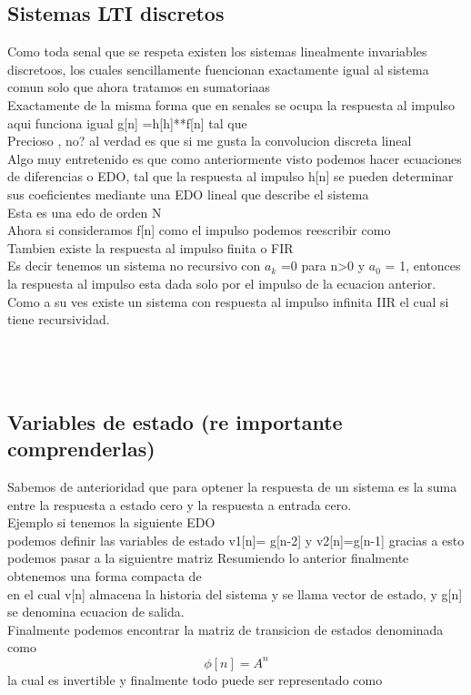 \subsection{Sistemas LTI discretos}
Como toda senal que se respeta existen los sistemas linealmente invariables discretoos, los cuales sencillamente fuencionan exactamente igual al sistema comun solo que ahora tratamos en sumatoriaas\\
Exactamente de la misma forma que en senales se ocupa la respuesta al impulso aqui funciona igual g[n] =h[h]**f[n]  tal que
 \\ Precioso , no? al verdad es que si me gusta la convolucion discreta lineal \\
Algo muy entretenido es que como anteriormente visto podemos hacer ecuaciones de diferencias o EDO, tal que la respuesta al impulso h[n] se pueden determinar sus coeficientes mediante una EDO lineal que describe el sistema
\\ Esta es una edo de orden N \\
Ahora si consideramos f[n] como el impulso podemos reescribir como
 \\
Tambien existe la respuesta al impulso finita o FIR\\
Es decir tenemos un sistema no recursivo con $a_k$ =0 para n>0 y $a_0$ = 1, entonces la respuesta al impulso esta dada solo por el impulso de la ecuacion anterior. \\
Como a su ves existe un sistema con respuesta al impulso infinita IIR el cual si tiene recursividad.
 \\ \\ \\ \\ 
\subsection{Variables de estado (re importante comprenderlas)}
Sabemos de anterioridad que para optener la respuesta de un sistema es la suma entre la respuesta a estado cero y la respuesta a entrada cero. \\
Ejemplo si tenemos la siguiente  EDO
 \\ podemos definir las variables de estado v1[n]= g[n-2] y v2[n]=g[n-1] gracias a esto podemos pasar a la siguientre matriz
Resumiendo lo anterior finalmente obtenemos una forma compacta de 
\\ en el cual v[n] almacena la historia del sistema y se llama vector de estado, y g[n] se denomina ecuacion de salida.\\
Finalmente podemos encontrar la matriz de transicion de estados denominada como $$\phi[n] =A^n$$ la cual es invertible y finalmente todo puede ser representado como 

